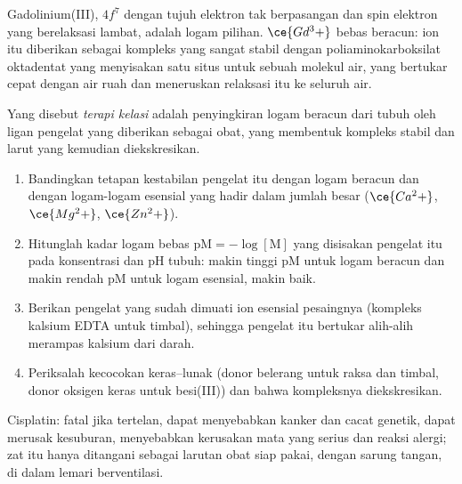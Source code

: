 Gadolinium(III), $4f^7$ dengan tujuh elektron tak berpasangan dan spin elektron yang
berelaksasi lambat, adalah logam pilihan. $\ce{Gd^3+}$ bebas beracun: ion itu diberikan sebagai
kompleks yang sangat stabil dengan poliaminokarboksilat oktadentat yang menyisakan satu
situs untuk sebuah molekul air, yang bertukar cepat dengan air ruah dan meneruskan
relaksasi itu ke seluruh air.

\begin{definition}\label{def:b3:bioinorganic:chelation-therapy}
Yang disebut \emph{terapi kelasi} adalah penyingkiran logam beracun
dari tubuh oleh ligan pengelat yang diberikan sebagai obat, yang membentuk kompleks stabil
dan larut yang kemudian diekskresikan.
\end{definition}

\begin{method}\label{met:b3:bioinorganic:choose-chelator}
\begin{enumerate}
  \item Bandingkan tetapan kestabilan pengelat itu dengan logam beracun
        dan dengan logam-logam esensial yang hadir dalam jumlah besar ($\ce{Ca^2+}$, $\ce{Mg^2+}$,
        $\ce{Zn^2+}$).
  \item Hitunglah kadar logam bebas $\mathrm{pM} = -\log[\mathrm M]$ yang disisakan pengelat itu pada
        konsentrasi dan pH tubuh: makin tinggi pM untuk logam beracun dan makin
        rendah pM untuk logam esensial, makin baik.
  \item Berikan pengelat yang sudah dimuati ion esensial pesaingnya (kompleks
        kalsium EDTA untuk timbal), sehingga pengelat itu bertukar alih-alih
        merampas kalsium dari darah.
  \item Periksalah kecocokan keras--lunak (donor belerang untuk raksa dan timbal, donor
        oksigen keras untuk besi(III)) dan bahwa kompleksnya diekskresikan.
\end{enumerate}
\end{method}

\begin{safety}{}
Cisplatin: fatal jika tertelan, dapat menyebabkan kanker dan cacat genetik, dapat merusak
kesuburan, menyebabkan kerusakan mata yang serius dan reaksi alergi; zat itu hanya ditangani
sebagai larutan obat siap pakai, dengan sarung tangan, di dalam lemari berventilasi.
\end{safety}

